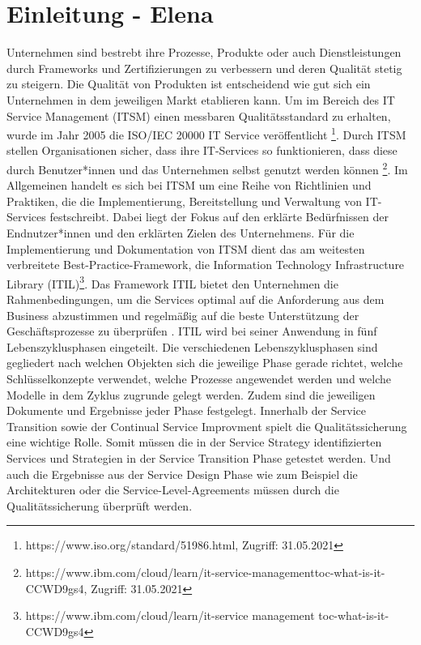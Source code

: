 \documentclass[sigconf]{acmart}
\begin{document}
\section{Einleitung - Elena}
Unternehmen sind bestrebt ihre Prozesse, Produkte oder auch Dienstleistungen durch Frameworks und Zertifizierungen zu verbessern und deren Qualität stetig zu steigern. Die Qualität von Produkten ist entscheidend wie gut sich ein Unternehmen in dem jeweiligen Markt etablieren kann. Um im Bereich des IT Service Management (ITSM) einen messbaren Qualitätsstandard zu erhalten, wurde im Jahr 2005 die ISO/IEC 20000 IT Service veröffentlicht \footnote{https://www.iso.org/standard/51986.html, Zugriff: 31.05.2021}. Durch ITSM stellen Organisationen sicher, dass ihre IT-Services so funktionieren, dass diese durch Benutzer*innen und das Unternehmen selbst genutzt werden können \footnote{https://www.ibm.com/cloud/learn/it-service-managementtoc-what-is-it-CCWD9gs4, Zugriff: 31.05.2021}. Im Allgemeinen handelt es sich bei ITSM um eine Reihe von Richtlinien und Praktiken, die die Implementierung, Bereitstellung und Verwaltung von IT-Services festschreibt. Dabei liegt der Fokus auf den erklärte Bedürfnissen der Endnutzer*innen und den erklärten Zielen des Unternehmens.
Für die Implementierung und Dokumentation von ITSM dient das
am weitesten verbreitete Best-Practice-Framework, die Information Technology Infrastructure Library (ITIL)\footnote{https://www.ibm.com/cloud/learn/it-service management toc-what-is-it-CCWD9gs4}. Das Framework ITIL bietet den Unternehmen die Rahmenbedingungen, um die Services optimal auf die Anforderung aus dem Business abzustimmen und regelmäßig auf die beste Unterstützung der Geschäftsprozesse zu überprüfen \cite{Beims.2015}. ITIL wird bei seiner Anwendung in fünf Lebenszyklusphasen eingeteilt. Die verschiedenen Lebenszyklusphasen sind gegliedert nach welchen Objekten sich die jeweilige Phase gerade richtet, welche Schlüsselkonzepte verwendet, welche Prozesse angewendet werden und welche Modelle in dem Zyklus zugrunde gelegt werden. Zudem sind die jeweiligen Dokumente und Ergebnisse jeder Phase festgelegt. Innerhalb der Service Transition sowie der Continual Service Improvment spielt die Qualitätssicherung
eine wichtige Rolle. Somit müssen die in der Service Strategy identifizierten Services und Strategien in der Service Transition Phase getestet werden. Und auch die Ergebnisse aus der Service Design Phase wie zum Beispiel die Architekturen oder die Service-Level-Agreements müssen durch die Qualitätssicherung überprüft werden\cite{Beims.2015}.
\end{document}

